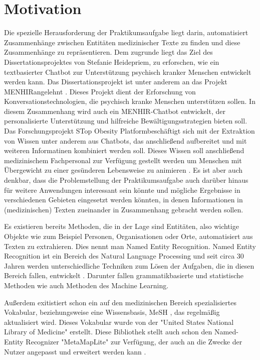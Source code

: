 \chapter{Motivation}

Die spezielle Herausforderung der Praktikumsaufgabe liegt darin, automatisiert Zusammenhänge zwischen Entitäten 
medizinischer Texte zu finden und diese Zusammenhänge zu repräsentieren. Dem zugrunde liegt das Ziel des 
Dissertationsprojektes von Stefanie Heidepriem, zu erforschen, wie ein textbasierter Chatbot zur Unterstützung 
psychisch kranker Menschen entwickelt werden kann. 
Das Dissertationsprojekt  ist unter anderem an das Projekt \glqq MENHIR\grqq angelehnt \cite{menhir}. Dieses Projekt dient der Erforschung 
von Konversationstechnologien, die psychisch kranke Menschen unterstützen sollen. In diesem Zusammenhang wird auch 
ein MENHIR-Chatbot entwickelt, der personalisierte Unterstützung und hilfreiche Bewältigungsstrategien bieten soll. 
Das Forschungsprojekt \glqq STop Obesity Platform\grqq beschäftigt sich mit der Extraktion von Wissen unter anderem aus Chatbots, 
das anschließend aufbereitet und mit weiteren Informatinen kombiniert werden soll. Dieses Wissen soll anschließend
medizinischem Fachpersonal zur Verfügung gestellt werden um Menschen mit Übergewicht zu einer gesünderen Lebensweise
zu animieren \cite{stopobesity}.
Es ist aber auch denkbar, dass die Problemstellung der Praktikumsaufgabe auch darüber hinaus für weitere Anwendungen 
interessant sein könnte und mögliche Ergebnisse in verschiedenen Gebieten eingesetzt werden könnten, in denen 
Informationen in (medizinischen) Texten zueinander in Zusammenhang gebracht werden sollen.

Es existieren bereits Methoden, die in der Lage sind Entitäten, also wichtige Objekte wie zum Beispiel Personen, 
Organisationen oder Orte, automatisiert aus Texten zu extrahieren. Dies nennt man Named Entity Recognition. Named Entity 
Recognition ist ein Bereich des Natural Language Processing und seit circa 30 Jahren werden unterschiedliche Techniken 
zum Lösen der Aufgaben, die in diesen Bereich fallen, entwickelt \cite{trends_in_ner}. Darunter fallen 
grammatikbasierte und statistische Methoden wie auch Methoden des Machine Learning.

Außerdem exitistiert schon ein auf den medizinischen Bereich spezialisiertes Vokabular, beziehungsweise eine Wissensbasis, 
MeSH \cite{mesh}, das regelmäßig aktualisiert wird. Dieses Vokabular wurde von 
der "United States National Library of Medicine" erstellt. Diese Bibliothek stellt auch schon den Named-Entity Recognizer 
"MetaMapLite" zur Verfügung, der auch an die Zwecke der Nutzer angepasst und erweitert werden kann \cite{metamaplite}. 

